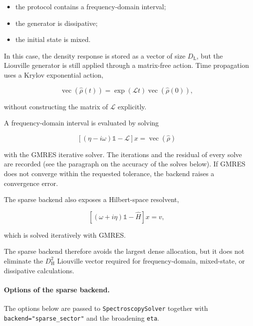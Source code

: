 \documentclass[11pt]{article}
\begin{document}
\begin{itemize}
    \item the protocol contains a frequency-domain interval;
    \item the generator is dissipative;
    \item the initial state is mixed.
\end{itemize}

In this case, the density response is stored as a vector of size
\(D_{\mathrm{L}}\), but the Liouville generator is still applied through a
matrix-free action. Time propagation uses a Krylov exponential action,

\begin{equation}
\operatorname{vec}(\hat{\rho}(t))
=
\exp(\mathcal{L}t)
\operatorname{vec}(\hat{\rho}(0)),
\end{equation}

without constructing the matrix of \(\mathcal{L}\) explicitly.

A frequency-domain interval is evaluated by solving

\begin{equation}
\left[
(\eta-i\omega)\mathbb{1}
-
\mathcal{L}
\right]x
=
\operatorname{vec}(\hat{\rho})
\end{equation}

with the GMRES iterative solver. The iterations and the residual of every solve are
recorded (see the paragraph on the accuracy of the solves below). If GMRES does not
converge within the requested tolerance, the backend raises a convergence error.

The sparse backend also exposes a Hilbert-space resolvent,

\begin{equation}
\left[
(\omega+i\eta)\mathbb{1}
-
\hat{H}
\right]x
=
v,
\end{equation}

which is solved iteratively with GMRES.

The sparse backend therefore avoids the largest dense allocation, but it does
not eliminate the \(D_{\mathrm{H}}^2\) Liouville vector required for
frequency-domain, mixed-state, or dissipative calculations.

\paragraph{Options of the sparse backend.}
The options below are passed to \texttt{SpectroscopySolver} together with
\texttt{backend="sparse\_sector"} and the broadening \texttt{eta}.
\end{document}
